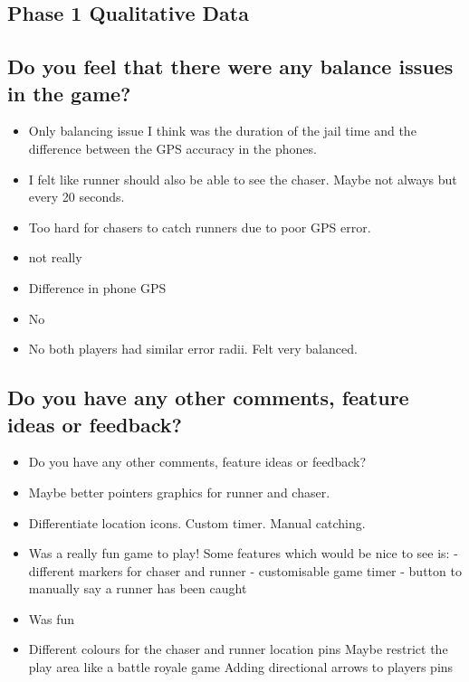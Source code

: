 \documentclass{l4proj}
\begin{document}
\begin{appendices}
\chapter{Phase 1 Qualitative Data}

\section{Do you feel that there were any balance issues in the game?}
\label{phase1balance}

\begin{itemize}
    \item Only balancing issue I think was the duration of the jail time and the difference between the GPS accuracy in the phones.
    \item I felt like runner should also be able to see the chaser. Maybe not always but every 20 seconds.
    \item Too hard for chasers to catch runners due to poor GPS error.
    \item not really
    \item Difference in phone GPS
    \item No
    \item No both players had similar error radii. Felt very balanced.
\end{itemize}

\section{Do you have any other comments, feature ideas or feedback?}
\label{phase1comments}

\begin{itemize}
    \item Do you have any other comments, feature ideas or feedback?
    \item Maybe better pointers graphics for runner and chaser.
    \item Differentiate location icons. Custom timer. Manual catching.
    \item Was a really fun game to play! Some features which would be nice to see is: - different markers for chaser and runner - customisable game timer - button to manually say a runner has been caught
    \item Was fun
    \item 	Different colours for the chaser and runner location pins Maybe restrict the play area like a battle royale game Adding directional arrows to players pins
\end{itemize}


\end{appendices}
\end{document}
